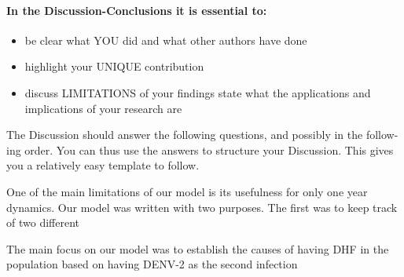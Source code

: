 \paragraph{In the Discussion-Conclusions it is essential to:}

\begin{itemize}
    \item
        be clear what YOU did and what other authors have done
    \item
        highlight your UNIQUE contribution
    
    \item
        discuss LIMITATIONS of your findings state what the
         applications and implications of your research are
\end{itemize}

The Discussion should answer the following questions, and possibly in the follow-
ing order. You can thus use the answers to structure your Discussion. This gives you
a relatively easy template to follow.

\noindent One of the main limitations of our model is its usefulness for only one year dynamics. 
Our model was written with two purposes. The first was to keep track of two different 

The main focus on our model was to establish the causes of having DHF in the population based on
having DENV-2 as the second infection 



